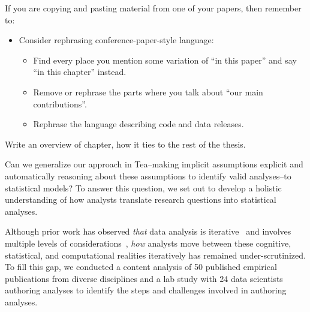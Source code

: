 If you are copying and pasting material from one of your papers, then remember to:
\begin{itemize}
    \item Consider rephrasing conference-paper-style language:
    \begin{itemize}
        \item Find every place you mention some variation of ``in this paper'' and say ``in this chapter'' instead.
        \item Remove or rephrase the parts where you talk about ``our main contributions''.
        \item Rephrase the language describing code and data releases.
    \end{itemize}
\end{itemize}

{\color{orange} Write an overview of chapter, how it ties to the rest of the thesis.}

Can we generalize our approach in Tea--making
implicit assumptions explicit and automatically reasoning about these
assumptions to identify valid analyses--to statistical models? To answer this
question, we set out to develop a holistic understanding of how analysts
translate research questions into statistical analyses. 


Although prior work has observed \textit{that} data analysis is
iterative~\cite{liu2019paths,grolemund2014cognitive} and involves multiple
levels of considerations~\cite{liu2019understanding}, \textit{how} analysts move
between these cognitive, statistical, and computational realities iteratively
has remained under-scrutinized. To fill this gap, we conducted a content analysis of 50 published
empirical publications from diverse disciplines and a lab study with 24 data
scientists authoring analyses to identify the steps and challenges involved in
authoring analyses. 

